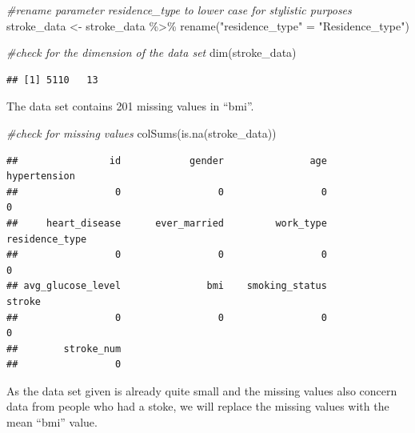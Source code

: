 \documentclass[
]{article}
\newenvironment{Shaded}{\begin{snugshade}}{\end{snugshade}}
\newcommand{\AttributeTok}[1]{\textcolor[rgb]{0.77,0.63,0.00}{#1}}
\newcommand{\CommentTok}[1]{\textcolor[rgb]{0.56,0.35,0.01}{\textit{#1}}}
\newcommand{\ConstantTok}[1]{\textcolor[rgb]{0.00,0.00,0.00}{#1}}
\newcommand{\FunctionTok}[1]{\textcolor[rgb]{0.00,0.00,0.00}{#1}}
\newcommand{\NormalTok}[1]{#1}
\newcommand{\OtherTok}[1]{\textcolor[rgb]{0.56,0.35,0.01}{#1}}
\newcommand{\SpecialCharTok}[1]{\textcolor[rgb]{0.00,0.00,0.00}{#1}}
\newcommand{\StringTok}[1]{\textcolor[rgb]{0.31,0.60,0.02}{#1}}
\renewcommand{\=}[1]{\stackrel{#1}{=}}
\theoremstyle{definition}
\theoremstyle{remark}
\begin{document}
\begin{Shaded}
\begin{Highlighting}[]
\CommentTok{\#rename parameter residence\_type to lower case for stylistic purposes}
\NormalTok{stroke\_data }\OtherTok{\textless{}{-}}\NormalTok{ stroke\_data }\SpecialCharTok{\%\textgreater{}\%} \FunctionTok{rename}\NormalTok{(}\StringTok{"residence\_type"} \OtherTok{=} \StringTok{"Residence\_type"}\NormalTok{)}
\end{Highlighting}
\end{Shaded}

\begin{Shaded}
\begin{Highlighting}[]
\CommentTok{\#check for the dimension of the data set}
\FunctionTok{dim}\NormalTok{(stroke\_data)}
\end{Highlighting}
\end{Shaded}

\begin{verbatim}
## [1] 5110   13
\end{verbatim}

The data set contains 201 missing values in ``bmi''.

\begin{Shaded}
\begin{Highlighting}[]
\CommentTok{\#check for missing values}
\FunctionTok{colSums}\NormalTok{(}\FunctionTok{is.na}\NormalTok{(stroke\_data))}
\end{Highlighting}
\end{Shaded}

\begin{verbatim}
##                id            gender               age      hypertension 
##                 0                 0                 0                 0 
##     heart_disease      ever_married         work_type    residence_type 
##                 0                 0                 0                 0 
## avg_glucose_level               bmi    smoking_status            stroke 
##                 0                 0                 0                 0 
##        stroke_num 
##                 0
\end{verbatim}

As the data set given is already quite small and the missing values also concern data from people who had a stoke, we will replace the missing values with the mean ``bmi'' value.

\begin{Shaded}
\end{Shaded}
\end{document}
